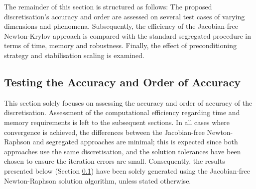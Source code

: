 \documentclass[sn-mathphys,Numbered]{sn-jnl}%
\begin{document}
The remainder of this section is structured as follows:
The proposed discretisation's accuracy and order are assessed on several test cases of varying dimensions and phenomena.
Subsequently, the efficiency of the Jacobian-free Newton-Krylov approach is compared with the standard segregated procedure in terms of time, memory and robustness. Finally, the effect of preconditioning strategy and stabilisation scaling is examined.


\subsection{Testing the Accuracy and Order of Accuracy}
\label{sec:accuracy}
This section solely focuses on assessing the accuracy and order of accuracy of the discretisation.
Assessment of the computational efficiency regarding time and memory requirements is left to the subsequent sections.
In all cases where convergence is achieved, the differences between the Jacobian-free Newton-Raphson and segregated approaches are minimal;
this is expected since both approaches use the same discretisation, and the solution tolerances have been chosen to ensure the iteration errors are small.
Consequently, the results presented below (Section \ref{sec:accuracy}) have been solely generated using the Jacobian-free Newton-Raphson solution algorithm, unless stated otherwise.


 
\end{document}
